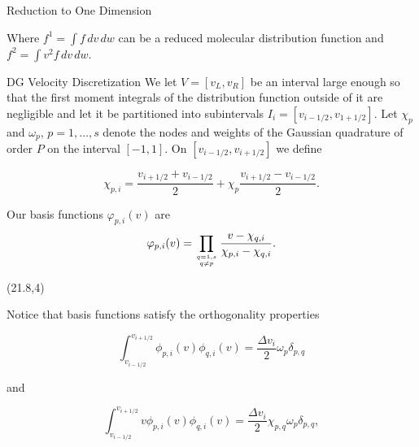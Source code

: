 \documentclass[unknownkeysallowed,final]{beamer}
\begin{document}
\begin{frame}{}
\begin{textblock}{19.5}
\begin{block}{\small{Reduction to One Dimension}}

Where $f^{1} = \int f \, dv \, dw $ can be a reduced molecular distribution function and $f^{2} = \int v^{2} f \, dv \, dw $.
\end{block}

\begin{block}{\small{DG Velocity Discretization}}
We let $V=[v_{L}, v_{R}]$ be an interval large enough so that the first moment integrals of the distribution function outside of it are negligible and let it be partitioned into subintervals $I_{i}=[v_{i-1/2},v_{1+1/2}]$. Let $\chi_{p}$ and $\omega_{p}$, $p=1,\ldots,s$ denote the nodes and weights of the Gaussian quadrature of order $P$ on the interval $[-1,1]$. On $[v_{i-1/2},v_{i+1/2}]$ we define

\begin{equation*}
\label{Chi}
\chi_{p,i} = \frac{v_{i+1/2} + v_{i-1/2}}{2} + \chi_{p}\frac{v_{i+1/2} - v_{i-1/2}}{2}.
\end{equation*}

Our basis functions $\varphi_{p,i}(v)$ are
\begin{equation*}
\varphi_{p,i}(v) = \prod\limits_{q=1,s \atop q \neq p} \frac{v-\chi_{q,i}}{\chi_{p,i} - \chi_{q,i}}.
\end{equation*}
\end{block}

\end{textblock}

\begin{textblock}{18}(21.8,4)

 \begin{block}{\small{}}
Notice that basis functions satisfy the orthogonality properties

\begin{equation*}
\int_{v_{i-1/2}}^{v_{i+1/2}} \phi_{p,i}(v) \phi_{q,i}(v) = \frac{\Delta v_{i}}{2} \omega_{p} \delta_{p,q}
\end{equation*}

and

\begin{equation*}
\int_{v_{i-1/2}}^{v_{i+1/2}} v \phi_{p,i}(v) \phi_{q,i}(v) = \frac{\Delta v_{i}}{2} \chi_{p,q} \omega_{p} \delta_{p,q},
\end{equation*}


\end{block}
\end{textblock}
\end{frame}
\end{document}
